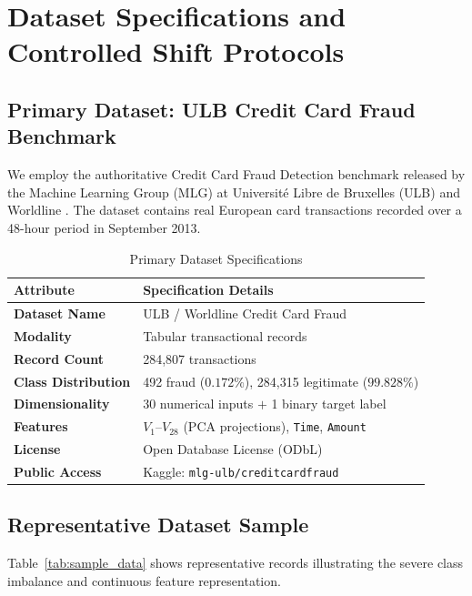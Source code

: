 \documentclass[10pt,a4paper,twocolumn]{article}
\begin{document}
\section{Dataset Specifications and Controlled Shift Protocols}

\subsection{Primary Dataset: ULB Credit Card Fraud Benchmark}
We employ the authoritative Credit Card Fraud Detection benchmark released by the Machine Learning Group (MLG) at Université Libre de Bruxelles (ULB) and Worldline \cite{dalpozzolo2015calibrating}. The dataset contains real European card transactions recorded over a 48-hour period in September 2013.

\begin{table}[htbp]
  \centering
  \small
  \caption{Primary Dataset Specifications}
  \label{tab:dataset_spec}
  \begin{tabularx}{\columnwidth}{lX}
    \toprule
    \textbf{Attribute} & \textbf{Specification Details} \\
    \midrule
    \textbf{Dataset Name} & ULB / Worldline Credit Card Fraud \\
    \textbf{Modality} & Tabular transactional records \\
    \textbf{Record Count} & 284,807 transactions \\
    \textbf{Class Distribution} & 492 fraud ($0.172\%$), 284,315 legitimate ($99.828\%$) \\
    \textbf{Dimensionality} & 30 numerical inputs $+$ 1 binary target label \\
    \textbf{Features} & $V_1$--$V_{28}$ (PCA projections), \texttt{Time}, \texttt{Amount} \\
    \textbf{License} & Open Database License (ODbL) \\
    \textbf{Public Access} & Kaggle: \texttt{mlg-ulb/creditcardfraud} \\
    \bottomrule
  \end{tabularx}
\end{table}

\subsection{Representative Dataset Sample}
Table~\ref{tab:sample_data} shows representative records illustrating the severe class imbalance and continuous feature representation.
\end{document}
